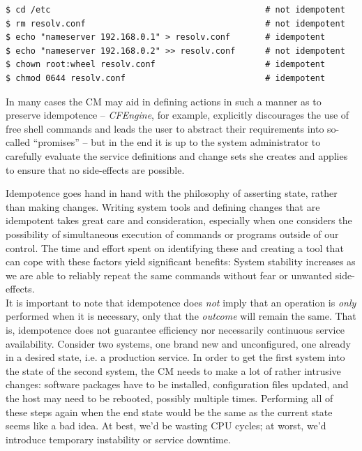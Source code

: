 \begin{lstlisting}[basicstyle=\scriptsize,float,label=code:cm:idempotence,caption={Idempotent and non-idempotent commands.}]
$ cd /etc                                           # not idempotent
$ rm resolv.conf                                    # not idempotent
$ echo "nameserver 192.168.0.1" > resolv.conf       # idempotent
$ echo "nameserver 192.168.0.2" >> resolv.conf      # not idempotent
$ chown root:wheel resolv.conf                      # idempotent
$ chmod 0644 resolv.conf                            # idempotent
\end{lstlisting}

In many cases the CM may aid in defining actions in
such a manner as to preserve idempotence -- {\em
CFEngine}, for example, explicitly discourages the use
of free shell commands and leads the user to abstract
their requirements into so-called
``promises''\cite{configuration-management:cfengine-manual}
-- but in the end it is up to the system administrator
to carefully evaluate the service definitions and
change sets she creates and applies to ensure that no
side-effects are possible.

Idempotence goes hand in hand with the philosophy of
asserting state, rather than making changes.  Writing
system tools and defining changes that are idempotent
takes great care and consideration, especially when
one considers the possibility of simultaneous
execution of commands or programs outside of our
control.  The time and effort spent on identifying
these and creating a tool that can cope with these
factors yield significant benefits: System stability
increases as we are able to reliably repeat the same
commands without fear or unwanted side-effects.  \\

It is important to note that idempotence does {\em
not} imply that an operation is {\em only} performed
when it is necessary, only that the {\em outcome} will
remain the same.  That is, idempotence does not
guarantee efficiency nor necessarily continuous
service availability.  Consider two systems, one brand
new and unconfigured, one already in a desired state,
i.e. a production service.  In order to get the first
system into the state of the second system, the CM
needs to make a lot of rather intrusive changes:
software packages have to be installed, configuration
files updated, and the host may need to be rebooted,
possibly multiple times.  Performing all of these
steps again when the end state would be the same as
the current state seems like a bad idea.  At best,
we'd be wasting CPU cycles; at worst, we'd introduce
temporary instability or service downtime.

